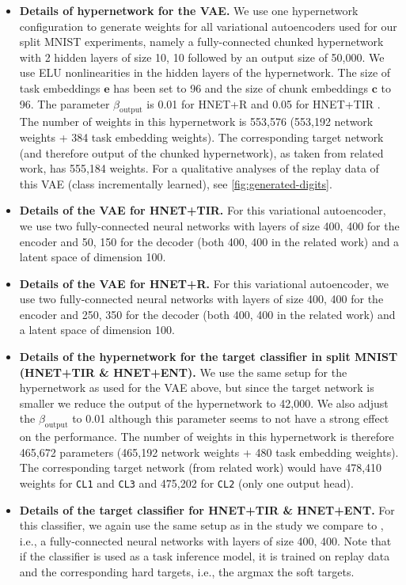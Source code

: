 \documentclass{article}
\begin{document}
\begin{itemize}
    \item \textbf{Details of hypernetwork for the VAE.}
    We use one hypernetwork configuration to generate weights for all variational autoencoders used for our split MNIST experiments, namely a fully-connected chunked hypernetwork with 2 hidden layers of size 10, 10 followed by an output size of 50,000. We use ELU nonlinearities in the hidden layers of the hypernetwork. The size of task embeddings $\mathbf{e}$ has been set to 96 and the size of chunk embeddings $\mathbf{c}$ to 96. The parameter $\beta_\text{output}$ is 0.01 for HNET+R and 0.05 for HNET+TIR
. The number of weights in this hypernetwork is 553,576 (553,192 network weights + 384 task embedding weights). The corresponding target network (and therefore output of the chunked hypernetwork), as taken from related work, has 555,184 weights. For a qualitative analyses of the replay data of this VAE (class incrementally learned), see \ref{fig:generated-digits}.
    
    \item \textbf{Details of the VAE for HNET+TIR.} 
    For this variational  autoencoder, we use two
    fully-connected neural networks with layers of size 
    400, 400 for the encoder and 50, 150 for the decoder (both 400, 400 in the related work) and a latent space of dimension 100.
    
    \item \textbf{Details of the VAE for HNET+R.}  For this variational  autoencoder, we use two
    fully-connected neural networks with layers of size 
    400, 400 for the encoder and 250, 350 for the decoder (both 400, 400 in the related work) and a latent space of dimension 100.
    
     \item \textbf{Details of the hypernetwork for the target   classifier in split MNIST (HNET+TIR \& HNET+ENT).} 
     We use the same setup for the hypernetwork as used for the VAE above, but since the target network is smaller we reduce the output of the hypernetwork to 42,000. We also adjust 
     the $\beta_\text{output}$ to 0.01 although this parameter seems to not have a strong effect on the performance.
      The number of weights in this hypernetwork is therefore 465,672 parameters (465,192 network weights + 480 task embedding weights). The corresponding target network (from related work) would have 478,410 weights for  \texttt{CL1} and  \texttt{CL3} and 475,202 for  \texttt{CL2} (only one output head).
     
     \item \textbf{Details of the target classifier for HNET+TIR \& HNET+ENT.} 
     For this classifier, we again use the same setup as in the study we compare to \citep{van_de_ven_three_2019}, i.e., a fully-connected neural networks with layers of size 400, 400.
     Note that if the classifier is used as a task inference model, it is trained on replay data and the corresponding hard targets, i.e., the argmax the soft targets.
\end{itemize}
\end{document}
